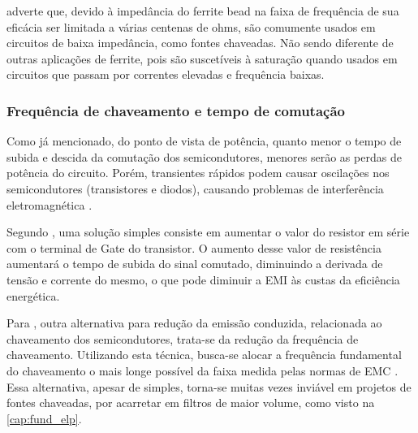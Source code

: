              adverte que, devido à impedância do ferrite bead na faixa de frequência de sua eficácia ser limitada a várias centenas de ohms, são comumente usados em circuitos de baixa impedância, como fontes chaveadas. Não sendo diferente de outras aplicações de ferrite, pois são suscetíveis à saturação quando usados em circuitos que passam por correntes elevadas e frequência baixas.
            
            \subsubsection{Frequência de chaveamento e tempo de comutação} \label{cap:fund_emc_conv_mitig_trans}
            
            Como já mencionado, do ponto de vista de potência, quanto menor o tempo de subida e descida da comutação dos semicondutores, menores serão as perdas de potência do circuito. Porém, transientes rápidos podem causar oscilações nos semicondutores (transistores e diodos), causando problemas de interferência eletromagnética \cite{ref:EMC_artigo_Texas}. 
            
            Segundo , uma solução simples consiste em aumentar o valor do resistor em série com o terminal de Gate do transistor. O aumento desse valor de resistência aumentará o tempo de subida do sinal comutado, diminuindo a derivada de tensão e corrente do mesmo, o que pode diminuir a EMI às custas da eficiência energética.
            
            Para , outra alternativa para redução da emissão conduzida, relacionada ao chaveamento dos semicondutores, trata-se da redução da frequência de chaveamento. Utilizando esta técnica, busca-se alocar a frequência fundamental do chaveamento o mais longe possível da faixa medida pelas normas de EMC \cite{ref:EMC_artigo_schlichting}. Essa alternativa, apesar de simples, torna-se muitas vezes inviável em projetos de fontes chaveadas, por acarretar em filtros de maior volume, como visto na \autoref{cap:fund_elp}.
            
            
